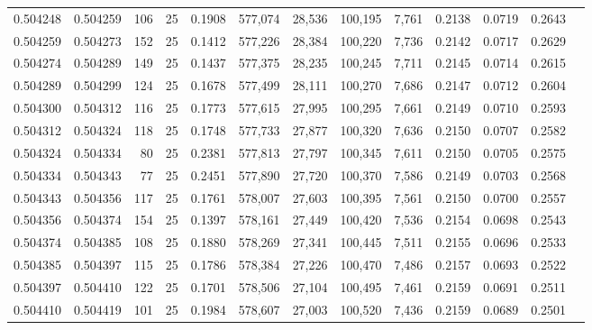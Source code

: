 \begin{tabular}{rrrrrrrrrrrrr}
0.504248 & 0.504259 & 106 &  25 &                                     0.1908 & 577,074 &  28,536 & 100,195 &   7,761 & 0.2138 & 0.0719 & 0.2643 \\
0.504259 & 0.504273 & 152 &  25 &                                     0.1412 & 577,226 &  28,384 & 100,220 &   7,736 & 0.2142 & 0.0717 & 0.2629 \\
0.504274 & 0.504289 & 149 &  25 &                                     0.1437 & 577,375 &  28,235 & 100,245 &   7,711 & 0.2145 & 0.0714 & 0.2615 \\
0.504289 & 0.504299 & 124 &  25 &                                     0.1678 & 577,499 &  28,111 & 100,270 &   7,686 & 0.2147 & 0.0712 & 0.2604 \\
0.504300 & 0.504312 & 116 &  25 &                                     0.1773 & 577,615 &  27,995 & 100,295 &   7,661 & 0.2149 & 0.0710 & 0.2593 \\
0.504312 & 0.504324 & 118 &  25 &                                     0.1748 & 577,733 &  27,877 & 100,320 &   7,636 & 0.2150 & 0.0707 & 0.2582 \\
0.504324 & 0.504334 &  80 &  25 &                                     0.2381 & 577,813 &  27,797 & 100,345 &   7,611 & 0.2150 & 0.0705 & 0.2575 \\
0.504334 & 0.504343 &  77 &  25 &                                     0.2451 & 577,890 &  27,720 & 100,370 &   7,586 & 0.2149 & 0.0703 & 0.2568 \\
0.504343 & 0.504356 & 117 &  25 &                                     0.1761 & 578,007 &  27,603 & 100,395 &   7,561 & 0.2150 & 0.0700 & 0.2557 \\
0.504356 & 0.504374 & 154 &  25 &                                     0.1397 & 578,161 &  27,449 & 100,420 &   7,536 & 0.2154 & 0.0698 & 0.2543 \\
0.504374 & 0.504385 & 108 &  25 &                                     0.1880 & 578,269 &  27,341 & 100,445 &   7,511 & 0.2155 & 0.0696 & 0.2533 \\
0.504385 & 0.504397 & 115 &  25 &                                     0.1786 & 578,384 &  27,226 & 100,470 &   7,486 & 0.2157 & 0.0693 & 0.2522 \\
0.504397 & 0.504410 & 122 &  25 &                                     0.1701 & 578,506 &  27,104 & 100,495 &   7,461 & 0.2159 & 0.0691 & 0.2511 \\
0.504410 & 0.504419 & 101 &  25 &                                     0.1984 & 578,607 &  27,003 & 100,520 &   7,436 & 0.2159 & 0.0689 & 0.2501 \\

\end{tabular}
